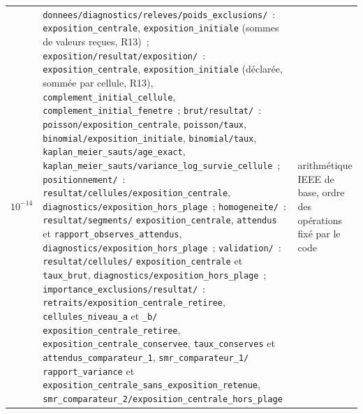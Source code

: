 \documentclass[a4paper,11pt]{article}
\newcommand{\code}[1]{\texttt{\small #1}}
\begin{document}
{\begin{longtable}{@{}p{1.4cm}>{\raggedright\arraybackslash}p{9.4cm}p{3.8cm}@{}}
$10^{-14}$ & \code{donnees/diagnostics/releves/poids\_exclusions/}~: \code{exposition\_centrale}, \code{exposition\_initiale} (sommes de valeurs reçues, R13)~; \code{exposition/resultat/exposition/}~: \code{exposition\_centrale}, \code{exposition\_initiale} (déclarée, sommée par cellule, R13), \code{complement\_initial\_cellule}, \code{complement\_initial\_fenetre}~; \code{brut/resultat/}~: \code{poisson/exposition\_centrale}, \code{poisson/taux}, \code{binomial/exposition\_initiale}, \code{binomial/taux}, \code{kaplan\_meier\_sauts/age\_exact}, \code{kaplan\_meier\_sauts/}\allowbreak\code{variance\_log\_survie\_cellule}~; \code{positionnement/}~: \code{resultat/cellules/exposition\_centrale}, \code{diagnostics/exposition\_hors\_plage}~; \code{homogeneite/}~: \code{resultat/segments/} \code{exposition\_centrale}, \code{attendus} et \code{rapport\_observes\_attendus}, \code{diagnostics/exposition\_hors\_plage}~; \code{validation/}~: \code{resultat/cellules/} \code{exposition\_centrale} et \code{taux\_brut}, \code{diagnostics/exposition\_hors\_plage}~; \code{importance\_exclusions/resultat/}~: \code{retraits/exposition\_centrale\_retiree}, \code{cellules\_niveau\_a} et \code{\_b/} \code{exposition\_centrale\_retiree}, \code{exposition\_centrale\_conservee}, \code{taux\_conserves} et \code{attendus\_comparateur\_1}, \code{smr\_comparateur\_1/} \code{rapport\_variance} et \code{exposition\_centrale\_sans\_exposition\_retenue}, \code{smr\_comparateur\_2/exposition\_centrale\_hors\_plage} & arithmétique IEEE de base, ordre des opérations fixé par le code \\

\end{longtable}}
\end{document}
